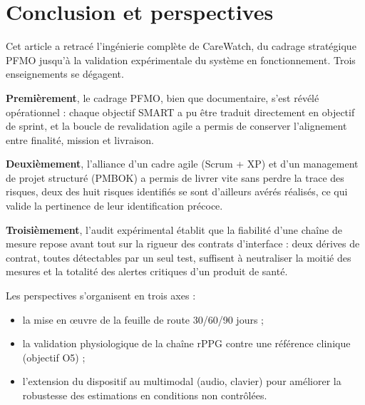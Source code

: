 \documentclass[11pt,a4paper]{article}
\begin{document}
\section{Conclusion et perspectives}
\label{sec:conclusion}

Cet article a retracé l'ingénierie complète de CareWatch, du cadrage stratégique PFMO jusqu'à la
validation expérimentale du système en fonctionnement. Trois enseignements se dégagent.

\textbf{Premièrement}, le cadrage PFMO, bien que documentaire, s'est révélé opérationnel : chaque
objectif SMART a pu être traduit directement en objectif de sprint, et la boucle de revalidation agile
a permis de conserver l'alignement entre finalité, mission et livraison.

\textbf{Deuxièmement}, l'alliance d'un cadre agile (Scrum + XP) et d'un management de projet structuré
(PMBOK) a permis de livrer vite sans perdre la trace des risques, deux des huit risques identifiés se
sont d'ailleurs avérés réalisés, ce qui valide la pertinence de leur identification précoce.

\textbf{Troisièmement}, l'audit expérimental établit que la fiabilité d'une chaîne de mesure repose
avant tout sur la rigueur des contrats d'interface : deux dérives de contrat, toutes détectables par un
seul test, suffisent à neutraliser la moitié des mesures et la totalité des alertes critiques d'un
produit de santé.

Les perspectives s'organisent en trois axes :
\begin{itemize}[leftmargin=1.5em,itemsep=1pt,topsep=2pt,parsep=0pt]
 \item la mise en œuvre de la feuille de route 30/60/90 jours ;
 \item la validation physiologique de la chaîne rPPG contre une référence clinique (objectif O5) ;
 \item l'extension du dispositif au multimodal (audio, clavier) pour améliorer la robustesse des
 estimations en conditions non contrôlées.
\end{itemize}
\end{document}
